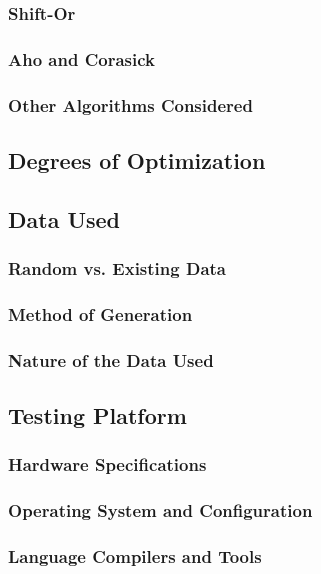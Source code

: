 \subsubsection{Shift-Or}

\subsubsection{Aho and Corasick}

\subsubsection{Other Algorithms Considered}

\subsection{Degrees of Optimization}

\subsection{Data Used}

\subsubsection{Random vs. Existing Data}

\subsubsection{Method of Generation}

\subsubsection{Nature of the Data Used}

\subsection{Testing Platform}

\subsubsection{Hardware Specifications}

\subsubsection{Operating System and Configuration}

\subsubsection{Language Compilers and Tools}
